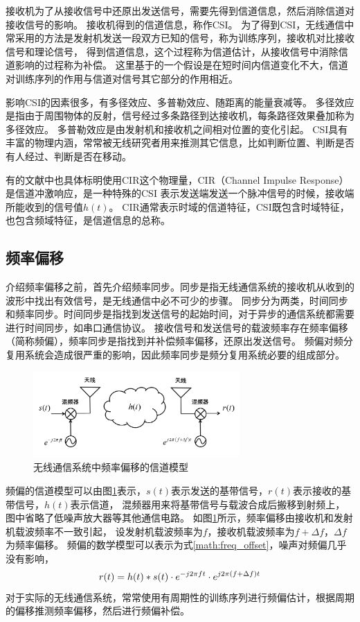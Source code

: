 		接收机为了从接收信号中还原出发送信号，需要先得到信道信息，然后消除信道对接收信号的影响。
		接收机得到的信道信息，称作CSI。
		为了得到CSI，无线通信中常采用的方法是发射机发送一段双方已知的信号，称为训练序列，接收机对比接收信号和理论信号，
		得到信道信息，这个过程称为信道估计，从接收信号中消除信道影响的过程称为补偿\cite{book06commprin}。
		这里基于的一个假设是在短时间内信道变化不大，信道对训练序列的作用与信道对信号其它部分的作用相近。

		影响CSI的因素很多，有多径效应、多普勒效应、随距离的能量衰减等。
		多径效应是指由于周围物体的反射，信号经过多条路径到达接收机，每条路径效果叠加称为多径效应\cite{book06commprin}。
		多普勒效应是由发射机和接收机之间相对位置的变化引起。
		CSI具有丰富的物理内涵，常常被无线研究者用来推测其它信息，比如判断位置、判断是否有人经过、判断是否在移动。

		有的文献中也具体标明使用CIR这个物理量，CIR（Channel Impulse Response）是信道冲激响应，是一种特殊的CSI
		表示发送端发送一个脉冲信号的时候，接收端所能收到的信号值$h(t)$。
		CIR通常表示时域的信道特征，CSI既包含时域特征，也包含频域特征，是信道信息的总称。

		\subsection{频率偏移}
		介绍频率偏移之前，首先介绍频率同步。同步是指无线通信系统的接收机从收到的波形中找出有效信号，是无线通信中必不可少的步骤。
		同步分为两类，时间同步和频率同步。时间同步是指找到发送信号的起始时间，对于异步的通信系统都需要进行时间同步，如串口通信协议。
		接收信号和发送信号的载波频率存在频率偏移（简称频偏），频率同步是指找到并补偿频率偏移，还原出发送信号。
		频偏对频分复用系统会造成很严重的影响，因此频率同步是频分复用系统必要的组成部分。

		\begin{figure}[H]
			\centering
			\includegraphics[width=0.7\textwidth]{img/freq_offseet_channel_model.png}
			\caption{无线通信系统中频率偏移的信道模型}
			\label{fig:freq_offseet_channel_model}
		\end{figure}
		频偏的信道模型可以由图\ref{fig:freq_offseet_channel_model}表示，$s(t)$表示发送的基带信号，$r(t)$表示接收的基带信号，$h(t)$表示信道，
		混频器用来将基带信号与载波合成后搬移到射频上，图中省略了低噪声放大器等其他通信电路。
		如图\ref{fig:freq_offseet_channel_model}所示，频率偏移由接收机和发射机载波频率不一致引起，
		设发射机载波频率为$f$，接收机载波频率为$f+\Delta f$，$\Delta f$为频率偏移。
		频偏的数学模型可以表示为式\ref{math:freq_offset}，噪声对频偏几乎没有影响，
		\begin{equation}
			\centering
			r(t)=h(t)*s(t) \cdot e^{-j2\pi ft} \cdot e^{j2\pi(f+\Delta f)t}
			\label{math:freq_offset}
		\end{equation}
		对于实际的无线通信系统，常常使用有周期性的训练序列进行频偏估计，根据周期的偏移推测频率偏移，然后进行频偏补偿。

